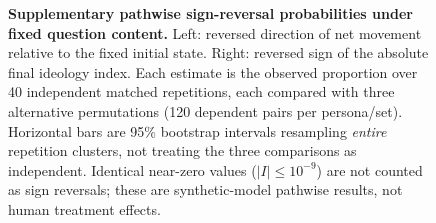 \documentclass[journal,10pt]{IEEEtran}
\begin{document}



\clearpage
\setcounter{figure}{0}
\renewcommand{\thefigure}{S\arabic{figure}}
\begin{figure}[!p]
\centering

\caption{\textbf{Supplementary pathwise sign-reversal probabilities under fixed question content.}
Left: reversed direction of net movement relative to the fixed initial state.
Right: reversed sign of the absolute final ideology index.
Each estimate is the observed proportion over 40 independent matched
repetitions, each compared with three alternative permutations
(120 dependent pairs per persona/set).
Horizontal bars are 95\% bootstrap intervals resampling \emph{entire}
repetition clusters, not treating the three comparisons as independent.
Identical near-zero values ($|I|\leq 10^{-9}$) are not counted as
sign reversals; these are synthetic-model pathwise results, not human
treatment effects.}
\label{fig:order-flips}
\end{figure}
\end{document}
